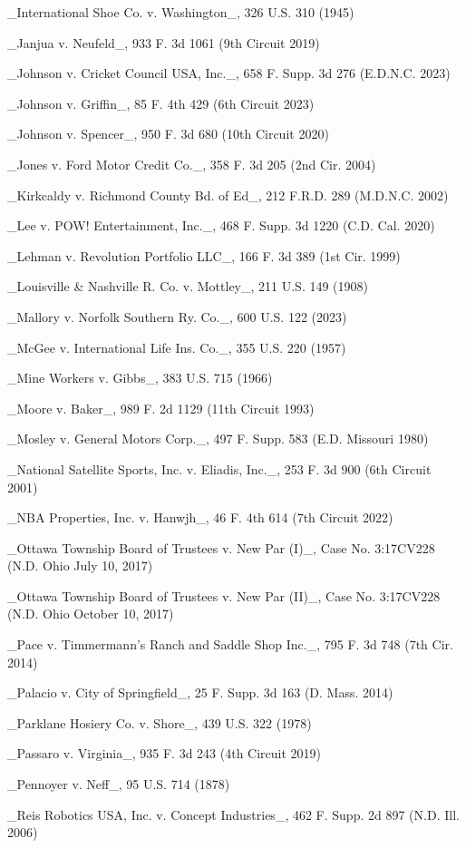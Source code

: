_International Shoe Co. v. Washington_, 326 U.S. 310 (1945)

_Janjua v. Neufeld_, 933 F. 3d 1061 (9th Circuit 2019)

_Johnson v. Cricket Council USA, Inc._, 658 F. Supp. 3d 276 (E.D.N.C. 2023)

_Johnson v. Griffin_, 85 F. 4th 429 (6th Circuit 2023)

_Johnson v. Spencer_, 950 F. 3d 680 (10th Circuit 2020)

_Jones v. Ford Motor Credit Co._, 358 F. 3d 205 (2nd Cir. 2004)

_Kirkcaldy v. Richmond County Bd. of Ed_, 212 F.R.D. 289 (M.D.N.C. 2002)

_Lee v. POW! Entertainment, Inc._, 468 F. Supp. 3d 1220 (C.D. Cal. 2020)

_Lehman v. Revolution Portfolio LLC_, 166 F. 3d 389 (1st Cir. 1999)

_Louisville & Nashville R. Co. v. Mottley_, 211 U.S. 149 (1908)

_Mallory v. Norfolk Southern Ry. Co._, 600 U.S. 122 (2023)

_McGee v. International Life Ins. Co._, 355 U.S. 220 (1957)

_Mine Workers v. Gibbs_, 383 U.S. 715 (1966)

_Moore v. Baker_, 989 F. 2d 1129 (11th Circuit 1993)

_Mosley v. General Motors Corp._, 497 F. Supp. 583 (E.D. Missouri 1980)

_National Satellite Sports, Inc. v. Eliadis, Inc._, 253 F. 3d 900 (6th Circuit 2001)

_NBA Properties, Inc. v. Hanwjh_, 46 F. 4th 614 (7th Circuit 2022)

_Ottawa Township Board of Trustees v. New Par (I)_, Case No. 3:17CV228 (N.D. Ohio July 10, 2017)

_Ottawa Township Board of Trustees v. New Par (II)_, Case No. 3:17CV228 (N.D. Ohio October 10, 2017)

_Pace v. Timmermann’s Ranch and Saddle Shop Inc._, 795 F. 3d 748 (7th Cir. 2014)

_Palacio v. City of Springfield_, 25 F. Supp. 3d 163 (D. Mass. 2014)

_Parklane Hosiery Co. v. Shore_, 439 U.S. 322 (1978)

_Passaro v. Virginia_, 935 F. 3d 243 (4th Circuit 2019)

_Pennoyer v. Neff_, 95 U.S. 714 (1878)

_Reis Robotics USA, Inc. v. Concept Industries_, 462 F. Supp. 2d 897 (N.D. Ill. 2006)

